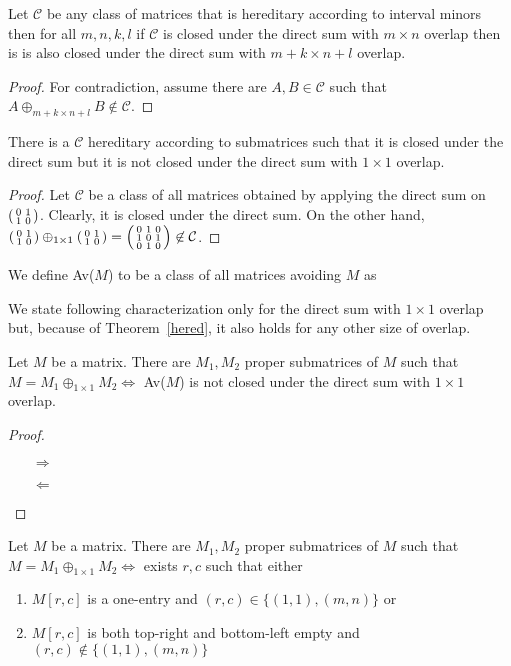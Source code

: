 \begin{thm}
\label{hered}
Let $\mathcal{C}$ be any class of matrices that is hereditary according to interval minors then for all $m,n,k,l$ if $\mathcal{C}$ is closed under the direct sum with $m\times n$ overlap then is is also closed under the direct sum with $m+k\times n+l$ overlap.
\end{thm}
\begin{proof}
For contradiction, assume there are $A,B\in\mathcal{C}$ such that $A\oplus_{m+k\times n+l}B\not\in\mathcal{C}$.
\end{proof}
\begin{obs}
There is a $\mathcal{C}$ hereditary according to submatrices such that it is closed under the direct sum but it is not closed under the direct sum with $1\times1$ overlap.
\end{obs}
\begin{proof}
Let $\mathcal{C}$ be a class of all matrices obtained by applying the direct sum on $\left(\begin{smallmatrix}0&1\\1&0\end{smallmatrix}\right)$. Clearly, it is closed under the direct sum. On the other hand, $\left(\begin{smallmatrix}0&1\\1&0\end{smallmatrix}\right)\oplus_{1\times1}\left(\begin{smallmatrix}0&1\\1&0\end{smallmatrix}\right)=\left(\begin{smallmatrix}0&1&0\\1&0&1\\0&1&0\end{smallmatrix}\right)\not\in\mathcal{C}$.
\end{proof}
\begin{ntn}
We define Av($M$) to be a class of all matrices avoiding $M$ as 
\end{ntn}
We state following characterization only for the direct sum with $1\times1$ overlap but, because of Theorem~\ref{hered}, it also holds for any other size of overlap.
\begin{thm}
Let $M$ be a matrix. There are $M_1,M_2$ proper submatrices of $M$ such that $M=M_1\oplus_{1\times1}M_2\Leftrightarrow$ Av($M$) is not closed under the direct sum with $1\times1$ overlap.
\end{thm}
\begin{proof}
\begin{itemize}
\item[$\Rightarrow$]
\item[$\Leftarrow$]
\end{itemize}
\end{proof}
\begin{obs}
Let $M$ be a matrix. There are $M_1,M_2$ proper submatrices of $M$ such that $M=M_1\oplus_{1\times1}M_2\Leftrightarrow$ exists $r,c$ such that either
\begin{enumerate}
\item $M[r,c]$ is a one-entry and $(r,c)\in\{(1,1),(m,n)\}$ or
\item $M[r,c]$ is both top-right and bottom-left empty and $(r,c)\not\in\{(1,1),(m,n)\}$
\end{enumerate}
\end{obs}